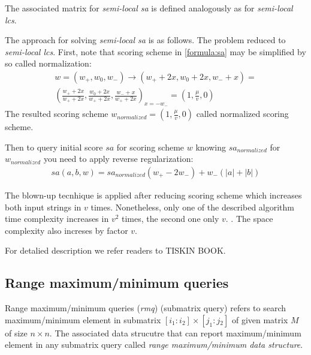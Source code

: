 The associated matrix for \emph{semi-local sa} is defined analogously as for \emph{semi-local lcs}.

The approach for solving \emph{semi-local sa} is as follows.
The problem reduced to \emph{semi-local lcs}.
First, note that scoring scheme in \ref{formula:sa}
may be simplified by so called normalization\cite{}:
\begin{equation}\label{weightNormalization}
    \begin{aligned}
    w = (w_{+}, w_{0} , w_{-}) \xrightarrow{} (w_{+} +2x , w_{0} + 2x , w_{-} + x) =\\ ( \frac{w_{+} +2x}{w_{+} +2x} , \frac {w_{0} + 2x}{w_{+} +2x} , \frac{w_{-} + x}{w_{+} +2x})_{x=-w_{-}} = (1,\frac{\mu}{v} ,0) 
    \end{aligned}
\end{equation}
The resulted scoring scheme $w_{normalized} = (1,\frac{\mu}{v} ,0)$ called normalized scoring scheme.

Then to query initial score $sa$ for scoring scheme $w$
knowing $sa_{normalized}$ for $w_{normalized}$ you need to apply reverse regularization:
\begin{equation}
    \begin{aligned}
    sa(a,b,w) = sa_{normalized}  (w_{+} - 2w_{-}) +  w_{-} (|a| + |b|)
\end{aligned}
\end{equation}

The blown-up tecnhique is applied after reducing scoring scheme
which increases both input strings in $v$ times.
Nonetheless, only one of the described algorithm time complexity increases in $v^{2}$ times, the second one only $v$. .
The space complexity also increses by factor $v$. 


For detalied description we refer readers to TISKIN BOOK\cite{}.

 
\subsection{Range maximum/minimum queries}

Range maximum/minimum queries (\emph{rmq}) (submatrix query)  refers to search maximum/minimum element in submatrix $[i_{1}:i{_2}]\times [j_{1}:j{_2}]$ of given matrix $M$ of size $n\times n$.
The associated data strucutre that can report maximum/minimum element in any  submatrix query called \emph{range maximum/minimum data structure}.

